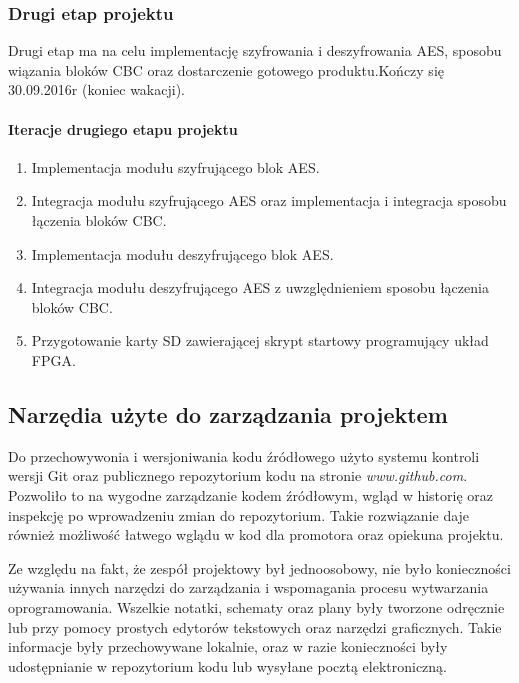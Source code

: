 \subsubsection{Drugi etap projektu}
Drugi etap ma na celu implementację szyfrowania i deszyfrowania AES, sposobu wiązania bloków CBC oraz dostarczenie gotowego produktu.Kończy się 30.09.2016r (koniec wakacji).
\paragraph{Iteracje drugiego etapu projektu}
\begin{enumerate}
\item Implementacja modułu szyfrującego blok AES.
\item Integracja modułu szyfrującego AES oraz implementacja i integracja sposobu łączenia bloków CBC.
\item Implementacja modułu deszyfrującego blok AES.
\item Integracja modułu deszyfrującego AES z uwzględnieniem sposobu łączenia bloków CBC.
\item Przygotowanie karty SD zawierającej skrypt startowy programujący układ FPGA.
\end{enumerate}

\subsection{Narzędia użyte do zarządzania projektem}
Do przechowywonia i wersjoniwania kodu źródłowego użyto systemu kontroli wersji Git oraz publicznego repozytorium kodu na stronie \textit{www.github.com}. Pozwoliło to na wygodne zarządzanie kodem źródłowym, wgląd w historię oraz inspekcję po wprowadzeniu zmian do repozytorium. Takie rozwiązanie daje również możliwość łatwego wglądu w kod dla promotora oraz opiekuna projektu.

Ze względu na fakt, że zespół projektowy był jednoosobowy, nie było konieczności używania innych narzędzi do zarządzania i wspomagania procesu wytwarzania oprogramowania. Wszelkie notatki, schematy oraz plany były tworzone odręcznie lub przy pomocy prostych edytorów tekstowych oraz narzędzi graficznych. Takie informacje były przechowywane lokalnie, oraz w razie konieczności były udostępnianie w repozytorium kodu lub wysyłane pocztą elektroniczną.